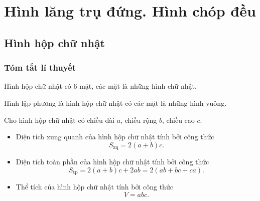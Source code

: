 \chapter{Hình lăng trụ đứng. Hình chóp đều}
\section{Hình hộp chữ nhật}
\subsection{Tóm tắt lí thuyết}
\begin{dn}
	Hình hộp chữ nhật có $6$ mặt, các mặt là những hình chữ nhật.
\end{dn}
\begin{dn}
	Hình lập phương là hình hộp chữ nhật có các mặt là những hình vuông.
\end{dn}
\begin{dn}
	Cho hình hộp chữ nhật có chiều dài $a$, chiều rộng $b$, chiều cao $c$.
	\begin{itemize}
		\item Diện tích xung quanh của hình hộp chữ nhật tính bởi công thức $$S_{\mathrm{xq}}=2(a+b)c.$$
		\item Diện tích toàn phần của hình hộp chữ nhật tính bởi công thức $$S_{\mathrm{tp}}=2(a+b)c+2ab=2(ab+bc+ca).$$
		\item Thể tích của hình hộp chữ nhật tính bởi công thức $$V=abc.$$
	\end{itemize}
\end{dn}

